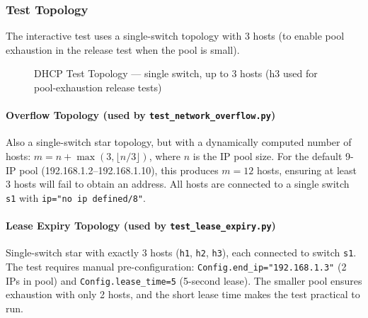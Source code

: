 \documentclass[12pt,a4paper]{article}
\begin{document}
\subsubsection{Test Topology}

The interactive test uses a single-switch topology with 3 hosts (to enable pool exhaustion in the release test when the pool is small).

\begin{figure}[H]
\centering
{}
\caption{DHCP Test Topology --- single switch, up to 3 hosts (h3 used for pool-exhaustion release tests)}
\end{figure}

\paragraph{Overflow Topology (used by \texttt{test\_network\_overflow.py})}

Also a single-switch star topology, but with a dynamically computed number of hosts: $m = n + \max(3, \lfloor n/3 \rfloor)$, where $n$ is the IP pool size. For the default 9-IP pool (192.168.1.2--192.168.1.10), this produces $m = 12$ hosts, ensuring at least 3 hosts will fail to obtain an address. All hosts are connected to a single switch \texttt{s1} with \texttt{ip="no ip defined/8"}.

\paragraph{Lease Expiry Topology (used by \texttt{test\_lease\_expiry.py})}

Single-switch star with exactly 3 hosts (\texttt{h1}, \texttt{h2}, \texttt{h3}), each connected to switch \texttt{s1}. The test requires manual pre-configuration: \texttt{Config.end\_ip="192.168.1.3"} (2 IPs in pool) and \texttt{Config.lease\_time=5} (5-second lease). The smaller pool ensures exhaustion with only 2 hosts, and the short lease time makes the test practical to run.
\end{document}
